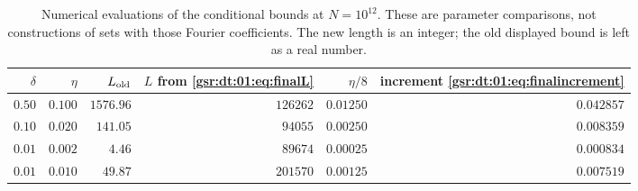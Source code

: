 \documentclass[11pt,letterpaper]{article}
\numberwithin{equation}{section}
\theoremstyle{definition}
\theoremstyle{remark}
\newcommand{\1}{\mathbf 1}
\begin{document}
\begin{table}[htbp]
\centering
\small
\begin{tabular}{rrrrrr}
\toprule
$\delta$ & $\eta$ & $L_{\rm old}$ & $L$ from \eqref{gsr:dt:01:eq:finalL}
 & $\eta/8$ & increment \eqref{gsr:dt:01:eq:finalincrement}\\
\midrule
$0.50$ & $0.100$ & $1576.96$ & $126262$ & $0.01250$ & $0.042857$\\
$0.10$ & $0.020$ & $141.05$ & $94055$ & $0.00250$ & $0.008359$\\
$0.01$ & $0.002$ & $4.46$ & $89674$ & $0.00025$ & $0.000834$\\
$0.01$ & $0.010$ & $49.87$ & $201570$ & $0.00125$ & $0.007519$\\
\bottomrule
\end{tabular}
\caption{Numerical evaluations of the conditional bounds at $N=10^{12}$.
These are parameter comparisons, not constructions of sets with those
Fourier coefficients. The new length is an integer; the old displayed
bound is left as a real number.}\label{gsr:dt:01:tab:increment}
\end{table}
\end{document}
